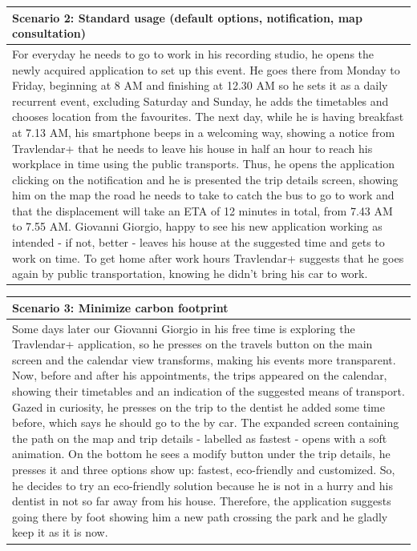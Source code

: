 %
\begin{center}
\def\arraystretch{1.5}
  \begin{tabular}{ | p{} | }
    \hline
    Scenario 2: Standard usage (default options, notification, map consultation) \\ \hline
    For everyday he needs to go to work in his recording studio, he opens the newly acquired application to set up this event. He goes there from Monday to Friday, beginning at 8 AM and finishing at 12.30 AM so he sets it as a daily recurrent event, excluding Saturday and Sunday, he adds the timetables and chooses location from the favourites. The next day, while he is having breakfast at 7.13 AM, his smartphone beeps in a welcoming way, showing a notice from Travlendar+ that he needs to leave his house in half an hour to reach his workplace in time using the public transports. Thus, he opens the application clicking on the notification and he is presented the trip details screen, showing him on the map the road he needs to take to catch the bus to go to work and that the displacement will take an ETA of 12 minutes in total, from 7.43 AM to 7.55 AM. Giovanni Giorgio, happy to see his new application working as intended - if not, better - leaves his house at the suggested time and gets to work on time. To get home after work hours Travlendar+ suggests that he goes again by public transportation, knowing he didn’t bring his car to work. \\ \hline
  \end{tabular}
\end{center}
%
\begin{center}
\def\arraystretch{1.5}
  \begin{tabular}{ | p{} | }
    \hline
    Scenario 3: Minimize carbon footprint \\ \hline
    Some days later our Giovanni Giorgio in his free time is exploring the Travlendar+ application, so he presses on the travels button on the main screen and the calendar view transforms, making his events more transparent. Now, before and after his appointments, the trips appeared on the calendar, showing their timetables and an indication of the suggested means of transport. Gazed in curiosity, he presses on the trip to the dentist he added some time before, which says he should go to the by car. The expanded screen containing the path on the map and trip details - labelled as fastest - opens with a soft animation. On the bottom he sees a modify button under the trip details, he presses it and three options show up: fastest, eco-friendly and customized. So, he decides to try an eco-friendly solution because he is not in a hurry and his dentist in not so far away from his house. Therefore, the application suggests going there by foot showing him a new path crossing the park and he gladly keep it as it is now. \\ \hline
  \end{tabular}
\end{center}
